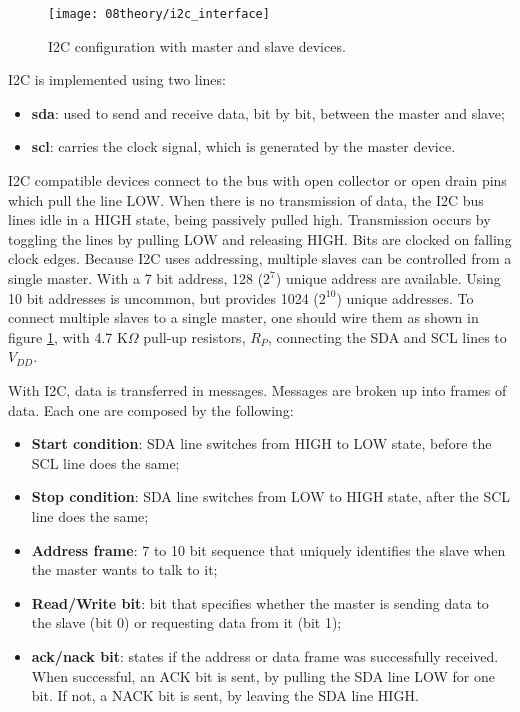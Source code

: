 \begin{figure}[H]
	\centering
	\texttt{[image: 08theory/i2c\_interface]}
	\caption{I2C configuration with master and slave devices.}
	\label{fig:i2c_interface}
\end{figure}

I2C is implemented using two lines:
\begin{itemize}
	\item \textbf{\ac{sda}}: used to send and receive data, bit by bit, between the master and slave;
	\item \textbf{\ac{scl}}: carries the clock signal, which is generated by the master device.
\end{itemize}

I2C compatible devices connect to the bus with open collector or open drain pins which pull the line LOW. When there is no transmission of data, the I2C bus lines idle in a HIGH state, being passively pulled high. Transmission occurs by toggling the lines by pulling LOW and releasing HIGH. Bits are clocked on falling clock edges. Because I2C uses addressing, multiple slaves can be controlled from a single master. With a 7 bit address, 128 ($2^7$) unique address are available. Using 10 bit addresses is uncommon, but provides 1024 ($2^{10}$) unique addresses. To connect multiple slaves to a single master, one should wire them as shown in figure \ref{fig:i2c_interface}, with 4.7 K$\Omega$ pull-up resistors, $R_{P}$, connecting the SDA and SCL lines to $V_{DD}$. \cite{i2c_basics}

\clearpage
With I2C, data is transferred in messages. Messages are broken up into frames of data. Each one are composed by the following:
\begin{itemize}
	\item \textbf{Start condition}: SDA line switches from HIGH to LOW state, before the SCL line does the same;
	\item \textbf{Stop condition}: SDA line switches from LOW to HIGH state, after the SCL line does the same;
	\item \textbf{Address frame}: 7 to 10 bit sequence that uniquely identifies the slave when the master wants to talk to it;
	\item \textbf{Read/Write bit}: bit that specifies whether the master is sending data to the slave (bit 0) or requesting data from it (bit 1);
	\item \textbf{\ac{ack}/\ac{nack} bit}: states if the address or data frame was successfully received. When successful, an ACK bit is sent, by pulling the SDA line LOW for one bit. If not, a NACK bit is sent, by leaving the SDA line HIGH.
\end{itemize}

